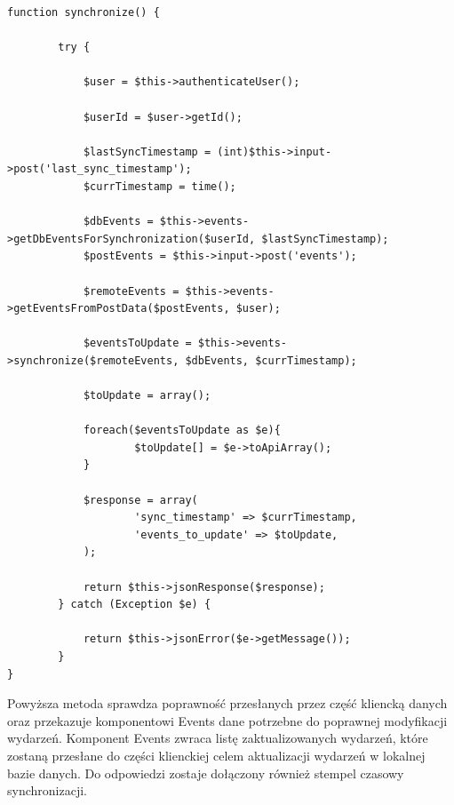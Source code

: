 \begin{lstlisting}[caption=Metoda synchronize interfejsu programowania Events\_api., label=amb, captionpos=b]
function synchronize() {

    	try {

        	$user = $this->authenticateUser();

        	$userId = $user->getId();

        	$lastSyncTimestamp = (int)$this->input->post('last_sync_timestamp');
        	$currTimestamp = time();

        	$dbEvents = $this->events->getDbEventsForSynchronization($userId, $lastSyncTimestamp);       	 
        	$postEvents = $this->input->post('events');

        	$remoteEvents = $this->events->getEventsFromPostData($postEvents, $user);
       	 
        	$eventsToUpdate = $this->events->synchronize($remoteEvents, $dbEvents, $currTimestamp);

        	$toUpdate = array();
       	 
        	foreach($eventsToUpdate as $e){
            		$toUpdate[] = $e->toApiArray();
        	}

        	$response = array(
            		'sync_timestamp' => $currTimestamp,
            		'events_to_update' => $toUpdate,
        	);

        	return $this->jsonResponse($response);
    	} catch (Exception $e) {

        	return $this->jsonError($e->getMessage());
    	}
}

\end{lstlisting}

Powyższa metoda sprawdza poprawność przesłanych przez część kliencką danych oraz przekazuje komponentowi Events dane potrzebne do poprawnej modyfikacji wydarzeń. Komponent Events zwraca listę zaktualizowanych wydarzeń, które zostaną przesłane do części klienckiej celem aktualizacji wydarzeń w lokalnej bazie danych. Do odpowiedzi zostaje dołączony również stempel czasowy synchronizacji.

